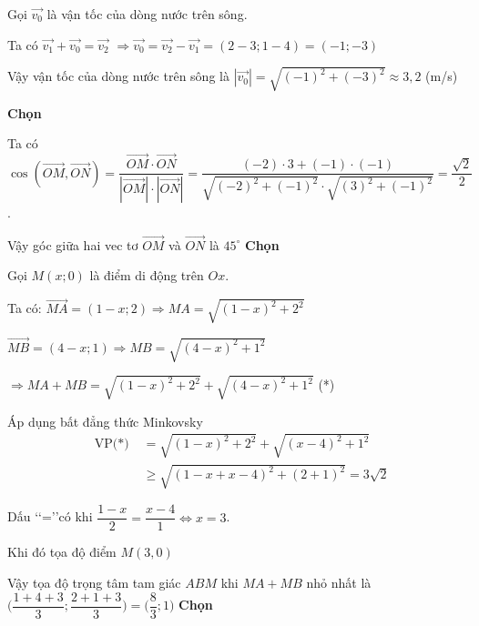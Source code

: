 \begin{loigiaiex}{9}
  \par Gọi $\overrightarrow {v_0}$ là vận tốc của dòng nước trên sông. \par Ta có $\overrightarrow {v_1}+ \overrightarrow {v_0}= \overrightarrow {v_2}$ $\Rightarrow \overrightarrow {v_0} =\overrightarrow {v_2} - \overrightarrow {v_1}= (2-3;1-4)=(-1;-3)$ \par Vậy vận tốc của dòng nước trên sông là $|\overrightarrow {v_0}| =\sqrt {(-1)^2+(-3)^2} \approx 3{,}2$ (m/s) \par  \phantom {a}\hfill {\bfseries \sffamily Chọn~} 
\end{loigiaiex}
\begin{loigiaiex}{10}
  \par Ta có $\cos (\overrightarrow {OM},\overrightarrow {ON})=\dfrac {\overrightarrow {OM}\cdot \overrightarrow {ON}}{|\overrightarrow {OM}|\cdot |\overrightarrow {ON}|}=\dfrac {(-2)\cdot 3 +(-1)\cdot (-1)}{\sqrt {(-2)^2+(-1)^2}\cdot \sqrt {(3)^2+(-1)^2}}=\dfrac {\sqrt {2}}{2}$. \par Vậy góc giữa hai vec tơ $\overrightarrow {OM}$ và $\overrightarrow {ON}$ là $45^\circ $  \phantom {a}\hfill {\bfseries \sffamily Chọn~} 
\end{loigiaiex}
\begin{loigiaiex}{11}
  \par Gọi $M(x;0)$ là điểm di động trên $Ox$. \par Ta có: $\overrightarrow {MA} = (1-x;2) \Rightarrow MA =\sqrt {(1-x)^2+2^2} $ \par $\overrightarrow {MB}=(4-x;1)\Rightarrow MB=\sqrt {(4-x)^2+1^2} $ \par $\Rightarrow MA + MB = \sqrt {(1-x)^2+2^2} + \sqrt {(4-x)^2+1^2}$ (*) \par Áp dụng bất đẳng thức Minkovsky \begin {eqnarray*} &\text {VP(*)}\;&= \sqrt {(1-x)^2+2^2} + \sqrt {(x-4)^2+1^2} \\ & &\ge \sqrt {(1-x+x-4)^2+(2+1)^2} = 3\sqrt {2} \end {eqnarray*} \par Dấu \lq \lq =\rq \rq có khi $\dfrac {1-x}{2}=\dfrac {x-4}{1} \Leftrightarrow x = 3 $. \par Khi đó tọa độ điểm $M(3,0)$ \par Vậy tọa độ trọng tâm tam giác $ABM$ khi $MA + MB$ nhỏ nhất là $\bigg (\dfrac {1+4+3}{3};\dfrac {2+1+3}{3}\bigg )=\bigg (\dfrac {8}{3};1\bigg )$  \phantom {a}\hfill {\bfseries \sffamily Chọn~} 
\end{loigiaiex}
